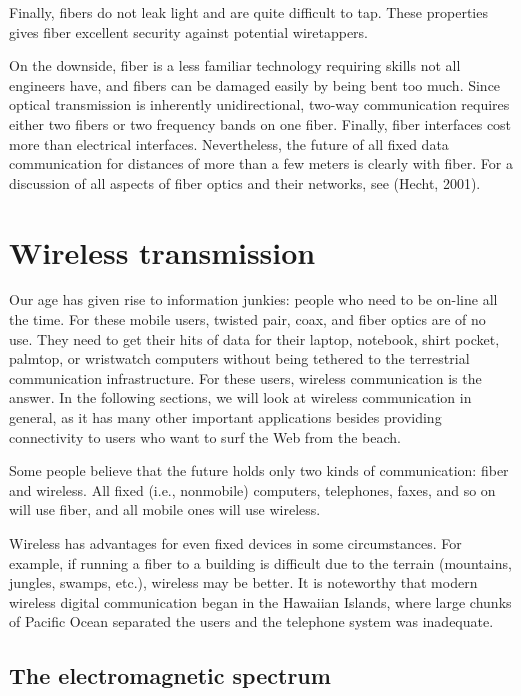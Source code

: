 Finally, fibers do not leak light and are quite difficult to tap. These
properties gives fiber excellent security against potential wiretappers.

On the downside, fiber is a less familiar technology requiring skills
not all engineers have, and fibers can be damaged easily by being bent
too much. Since optical transmission is inherently unidirectional,
two-way communication requires either two fibers or two frequency bands
on one fiber. Finally, fiber interfaces cost more than electrical
interfaces. Nevertheless, the future of all fixed data communication for
distances of more than a few meters is clearly with fiber. For a
discussion of all aspects of fiber optics and their networks, see
(Hecht, 2001).

\section{Wireless transmission}

Our age has given rise to information junkies: people who need to be
on-line all the time. For these mobile users, twisted pair, coax, and
fiber optics are of no use. They need to get their hits of data for
their laptop, notebook, shirt pocket, palmtop, or wristwatch computers
without being tethered to the terrestrial communication infrastructure.
For these users, wireless communication is the answer. In the following
sections, we will look at wireless communication in general, as it has
many other important applications besides providing connectivity to
users who want to surf the Web from the beach.

Some people believe that the future holds only two kinds of
communication: fiber and wireless. All fixed (i.e., nonmobile)
computers, telephones, faxes, and so on will use fiber, and all mobile
ones will use wireless.

Wireless has advantages for even fixed devices in some circumstances.
For example, if running a fiber to a building is difficult due to the
terrain (mountains, jungles, swamps, etc.), wireless may be better. It
is noteworthy that modern wireless digital communication began in the
Hawaiian Islands, where large chunks of Pacific Ocean separated the
users and the telephone system was inadequate.

\subsection{The electromagnetic spectrum}

